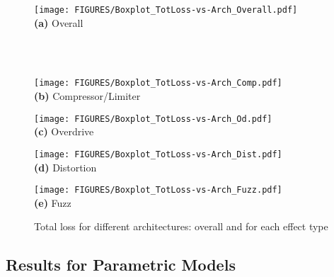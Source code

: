 \begin{figure*}[t]
    \begin{minipage}[b]{1\textwidth}
        \centering
        \texttt{[image: FIGURES/Boxplot\_TotLoss-vs-Arch\_Overall.pdf]}
        \\\textbf{(a)} Overall
        \label{fig:bp_loss_overall}
    \end{minipage}\\\\
    \begin{minipage}[b]{.245\textwidth}
        \centering
        \texttt{[image: FIGURES/Boxplot\_TotLoss-vs-Arch\_Comp.pdf]}
        \\\textbf{(b)} Compressor/Limiter
        \label{fig:bp_loss_comp}
    \end{minipage}
    \begin{minipage}[b]{.245\textwidth}
        \centering
        \texttt{[image: FIGURES/Boxplot\_TotLoss-vs-Arch\_Od.pdf]}
        \\\textbf{(c)} Overdrive
        \label{fig:bp_loss_od}
    \end{minipage}
    \begin{minipage}[b]{.245\textwidth}
        \centering
        \texttt{[image: FIGURES/Boxplot\_TotLoss-vs-Arch\_Dist.pdf]}
        \\\textbf{(d)} Distortion
        \label{fig:bp_loss_dist}
    \end{minipage}
    \begin{minipage}[b]{.245\textwidth}
        \centering
        \texttt{[image: FIGURES/Boxplot\_TotLoss-vs-Arch\_Fuzz.pdf]}
        \\\textbf{(e)} Fuzz
        \label{fig:bp_loss_fuzz}
    \end{minipage}
    \caption{Total loss for different architectures: overall and for each effect type}
    \label{fig:bp_loss}
\end{figure*}





\subsection{Results for Parametric Models}
\label{sec:results_parametric_models}

